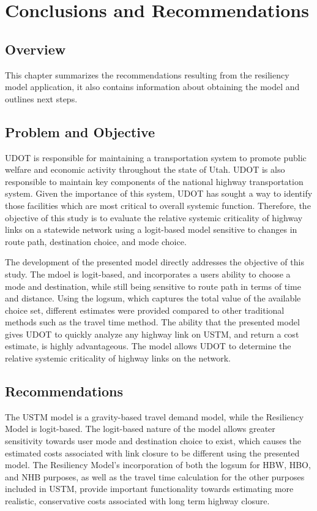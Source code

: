 \chapter{Conclusions and Recommendations}
\label{chp:chapter5}
\graphicspath{{figures/}{figures/chapter5/}}

\section{Overview}

This chapter summarizes the recommendations resulting from the resiliency
model application, it also contains information about obtaining the model and
outlines next steps.

\section{Problem and Objective}

UDOT is responsible for maintaining a
transportation system to promote public welfare and economic activity throughout
the state of Utah. UDOT is also responsible to maintain key components of the
national highway transportation system. Given the importance of this system,
UDOT has sought a way to identify those facilities which are most critical to
overall systemic function. Therefore, the objective of this study is to evaluate the relative systemic
criticality of highway links on a statewide network using a logit-based model
sensitive to changes in route path, destination choice, and mode choice.

The development of the presented model directly addresses the objective of
this study. The mdoel is logit-based, and incorporates a users
ability to choose a mode and destination, while still being sensitive to route
path in terms of time and distance. Using the logsum, which captures the total
value of the available choice set, different estimates were provided compared to
other traditional methods such as the travel time method. The ability that the
presented model gives UDOT to quickly analyze any highway link on USTM, and return a
cost estimate, is highly advantageous. The model allows UDOT to determine
the relative systemic criticality of highway links on the network.

\section{Recommendations}

The USTM model is a gravity-based travel demand model, while the Resiliency
Model is logit-based. The logit-based nature of the model allows
greater sensitivity towards user mode and destination choice to exist, which causes
the estimated costs associated with link closure to be different using the presented model. The Resiliency
Model's incorporation of both the logsum for HBW, HBO, and NHB purposes, as
well as the travel time calculation for the other purposes included in USTM,
provide important functionality towards estimating more realistic, conservative costs
associated with long term highway closure.

